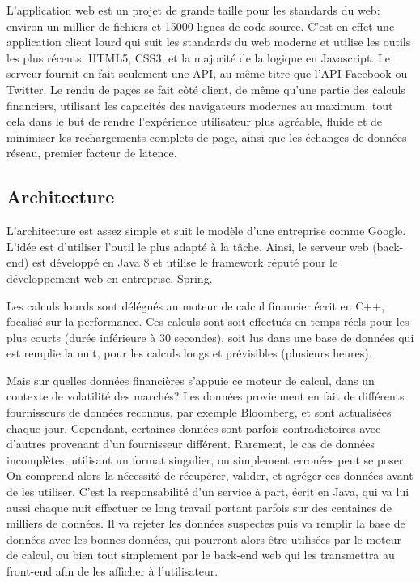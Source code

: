 \documentclass[a4paper,french,12pt]{article}
\begin{document}
			  L'application web est un projet de grande taille pour les standards du web: environ un millier de fichiers et 15000 lignes de code source. 
		  C'est en effet une application client lourd qui suit les standards du web moderne et utilise les outils les plus récents: HTML5, CSS3, et la majorité de la logique en Javascript. Le serveur fournit en fait seulement une API, au même titre que l'API Facebook ou Twitter.
		  Le rendu de pages se fait côté client, de même qu'une partie des calculs financiers, utilisant les capacités des navigateurs modernes au maximum, tout cela dans le but de rendre l'expérience utilisateur plus agréable, fluide et de minimiser les rechargements complets de page, ainsi que les échanges de données réseau, premier facteur de latence.


	\subsection{Architecture}
		
		L'architecture est assez simple et suit le modèle d'une entreprise comme Google. L'idée est d'utiliser l'outil le plus adapté à la tâche.
		Ainsi, le serveur web (back-end) est développé en Java 8 et utilise le framework réputé pour le développement web en entreprise, Spring.
		
		Les calculs lourds sont délégués au moteur de calcul financier écrit en C++, focalisé sur la performance. Ces calculs sont soit effectués en temps réels pour les plus courts (durée inférieure à 30 secondes), soit lus dans une base de données qui est remplie la nuit, pour les calculs longs et prévisibles (plusieurs heures).
		
		Mais sur quelles données financières s'appuie ce moteur de calcul, dans un contexte de volatilité des marchés?
		Les données proviennent en fait de différents fournisseurs de données reconnus, par exemple Bloomberg, et sont actualisées chaque jour. Cependant, certaines données sont parfois contradictoires avec d'autres provenant d'un fournisseur différent. Rarement, le cas de données incomplètes, utilisant un format singulier, ou simplement erronées peut se poser. 
		On comprend alors la nécessité de récupérer, valider, et agréger ces données avant de les utiliser. C'est la responsabilité d'un service à part, écrit en Java, qui va lui aussi chaque nuit effectuer ce long travail portant parfois sur des centaines de milliers de données. Il va rejeter les données suspectes puis va remplir la base de données avec les bonnes données, qui pourront alors être utilisées par le moteur de calcul, ou bien tout simplement par le back-end web qui les transmettra au front-end afin de les afficher à l'utilisateur.
	
\end{document}

